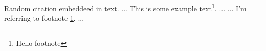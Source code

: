 \documentclass{article}
\begin{document}
Random citation \cite{DUMMY:1} embeddeed in text.
\newpage
...
This is some example text\footnote{\label{myfootnote}Hello footnote}.
...
...
I'm referring to footnote \ref{myfootnote}.
...

\newpage

 

\end{document}
